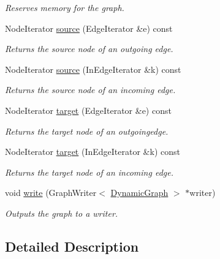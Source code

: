 \begin{DoxyCompactItemize}
\begin{DoxyCompactList}\small\item\em Reserves memory for the graph. \item\end{DoxyCompactList}\item 
NodeIterator \hyperlink{class_dynamic_graph_a33514500857b840c200300df52bfc38c}{source} (EdgeIterator \&e) const 
\begin{DoxyCompactList}\small\item\em Returns the source node of an outgoing edge. \item\end{DoxyCompactList}\item 
NodeIterator \hyperlink{class_dynamic_graph_ad402237d152a83fe948f8891a2ad1316}{source} (InEdgeIterator \&k) const 
\begin{DoxyCompactList}\small\item\em Returns the source node of an incoming edge. \item\end{DoxyCompactList}\item 
NodeIterator \hyperlink{class_dynamic_graph_a44edd0e001007679e8ae257bb7341bed}{target} (EdgeIterator \&e) const 
\begin{DoxyCompactList}\small\item\em Returns the target node of an outgoingedge. \item\end{DoxyCompactList}\item 
NodeIterator \hyperlink{class_dynamic_graph_a0d6d44c1f95ee743e57164afd68954fc}{target} (InEdgeIterator \&k) const 
\begin{DoxyCompactList}\small\item\em Returns the target node of an incoming edge. \item\end{DoxyCompactList}\item 
void \hyperlink{class_dynamic_graph_a10d7f8456bc3a9247ea9f3cc1aae63b0}{write} (GraphWriter$<$ \hyperlink{class_dynamic_graph}{DynamicGraph} $>$ $\ast$writer)
\begin{DoxyCompactList}\small\item\em Outputs the graph to a writer. \item\end{DoxyCompactList}\end{DoxyCompactItemize}


\subsection{Detailed Description}
